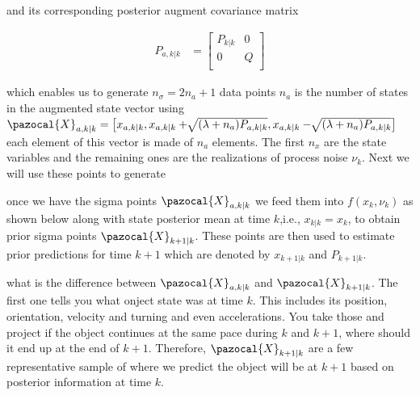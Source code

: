 \documentclass[a4paper,12pt]{article}
\begin{document}
and its corresponding posterior augment covariance matrix 

  \begin{align}
   P_{a,k|k} &= \begin{bmatrix}
         P_{k|k} & 0 \\
         0 & Q \\ 
         \end{bmatrix}
  \end{align}
  
which enables us to generate $n_\sigma = 2n_{a}+1$ data points $n_{a}$ is the number of states in the augmented state vector using $\pazocal{X}_{a,k|k} = \left[x_{a,k|k},x_{a,k|k}+\sqrt[]{(\lambda+n_a)P_{a,k|k}},
x_{a,k|k}-\sqrt[]{(\lambda+n_a)P_{a,k|k}} \right] $ each element of this vector is made of $n_a$ elements. The first $n_x$ are the state variables and the remaining ones are the realizations of process noise $\nu_k$. Next we will use these points to generate 

once we have the sigma points $\pazocal{X}_{a,k|k}$ we feed them into $f(x_{k},\nu_k)$ as shown below along with state posterior mean at time $k$,i.e., $x_{k|k} = x_k$, to obtain prior sigma points $\pazocal{X}_{k+1|k}$. These points are then used to estimate prior predictions for time $k+1$ which are denoted by $x_{k+1|k}$ and $P_{k+1|k}$.

what is the difference between $\pazocal{X}_{a,k|k}$ and $\pazocal{X}_{k+1|k}$. The first one tells you what onject state was at time $k$. This includes its position, orientation, velocity and turning and even accelerations. You take those and project if the object continues at the same pace during $k$ and $k+1$, where should it end up at the end of $k+1$. Therefore,  $\pazocal{X}_{k+1|k}$ are a few representative sample of where we predict the object will be at $k+1$ based on posterior information at time $k$.  
\end{document}
